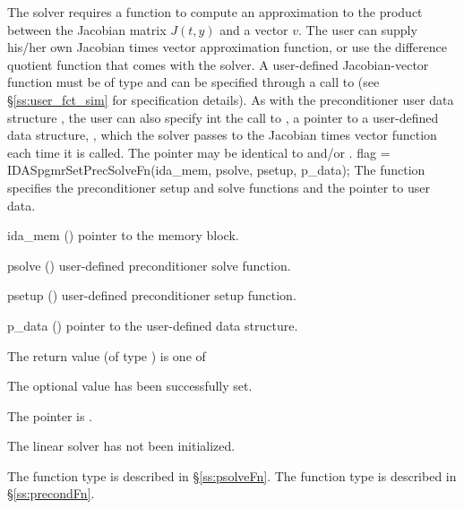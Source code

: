 The 
{\idaspgmr} solver requires a function to compute an approximation to the
product between the Jacobian matrix $J(t,y)$ and a vector $v$.
The user can supply his/her own Jacobian times vector approximation function, 
or use the difference quotient function  
that comes with the {\idaspgmr} solver.
A user-defined Jacobian-vector function must be of type  and 
can be specified through a call to  
(see \S\ref{ss:user_fct_sim} for specification details).
As with the preconditioner user data structure , 
the user can also specify int the call to , a pointer to a 
user-defined data structure, , which
the {\idaspgmr} solver passes to the Jacobian times vector function 
each time it is called.  
The pointer  may be identical to  and/or .
{
  flag = IDASpgmrSetPrecSolveFn(ida\_mem, psolve, psetup, p\_data);
}
{
  The function  specifies the preconditioner
  setup and solve functions and the pointer to user data.
}
{
  \begin{args}
  \item[ida\_mem] ()
    pointer to the {\ida} memory block.
  \item[psolve] ()
    user-defined preconditioner solve function.
  \item[psetup] ()
    user-defined preconditioner setup function.
  \item[p\_data] ()
     pointer to the user-defined data structure.
  \end{args}
}
{
  The return value  (of type ) is one of
  \begin{args}
  \item[\Id{IDASPGMR\_SUCCESS}] 
    The optional value has been successfully set.
  \item[\Id{IDASPGMR\_MEM\_NULL}]
    The  pointer is .
  \item[\Id{IDASPGMR\_LMEM\_NULL}]
    The {\idaspgmr} linear solver has not been initialized.
  \end{args}
}
{
   The function type  is described in \S\ref{ss:psolveFn}.
   The function type  is described in \S\ref{ss:precondFn}.
}
